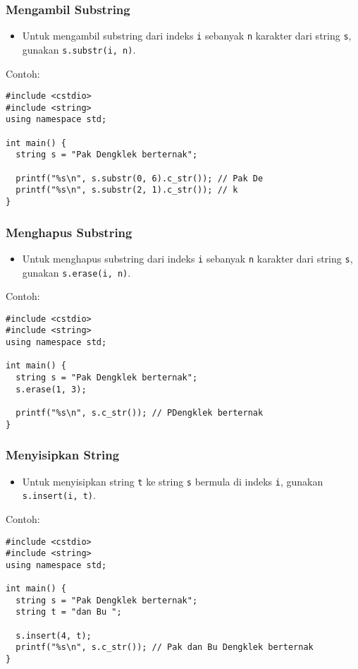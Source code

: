 \begin{frame}[fragile]
\frametitle{Mengambil Substring}
\begin{itemize}
  \item Untuk mengambil substring dari indeks \texttt{i} sebanyak \texttt{n} karakter dari string \texttt{s}, gunakan \texttt{s.substr(i, n)}.
\end{itemize}
Contoh:
\begin{lstlisting}
#include <cstdio>
#include <string>
using namespace std;

int main() {
  string s = "Pak Dengklek berternak";

  printf("%s\n", s.substr(0, 6).c_str()); // Pak De
  printf("%s\n", s.substr(2, 1).c_str()); // k
}
\end{lstlisting}
\end{frame}     

\begin{frame}[fragile]
\frametitle{Menghapus Substring}
\begin{itemize}
  \item Untuk menghapus substring dari indeks \texttt{i} sebanyak \texttt{n} karakter dari string \texttt{s}, gunakan \texttt{s.erase(i, n)}.
\end{itemize}
Contoh:
\begin{lstlisting}
#include <cstdio>
#include <string>
using namespace std;

int main() {
  string s = "Pak Dengklek berternak";
  s.erase(1, 3);

  printf("%s\n", s.c_str()); // PDengklek berternak
}
\end{lstlisting}
\end{frame}

\begin{frame}[fragile]
\frametitle{Menyisipkan String}
\begin{itemize}
  \item Untuk menyisipkan string \texttt{t} ke string \texttt{s} bermula di indeks \texttt{i}, gunakan \texttt{s.insert(i, t)}.
\end{itemize}

Contoh:
\begin{lstlisting}
#include <cstdio>
#include <string>
using namespace std;

int main() {
  string s = "Pak Dengklek berternak";
  string t = "dan Bu ";

  s.insert(4, t);
  printf("%s\n", s.c_str()); // Pak dan Bu Dengklek berternak
}
\end{lstlisting}
\end{frame}



